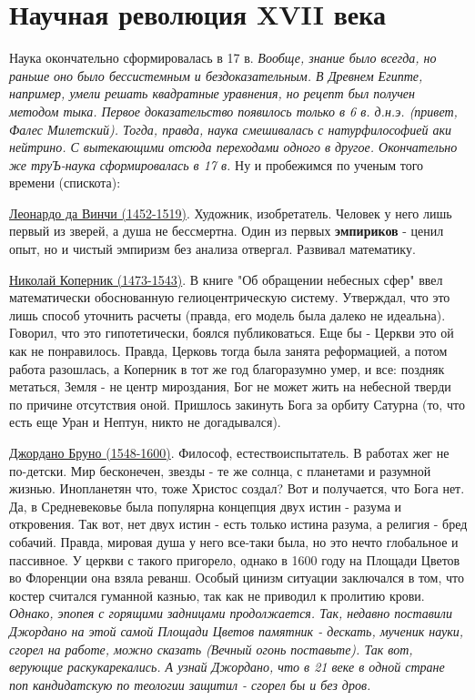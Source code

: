 \section{Научная революция XVII века}
Наука окончательно сформировалась в 17 в. \textit{Вообще, знание было всегда, но раньше оно было бессистемным и бездоказательным. В Древнем Египте, например, умели решать квадратные уравнения, но рецепт был получен методом тыка. Первое доказательство появилось только в 6 в. д.н.э. (привет, Фалес Милетский). Тогда, правда, наука смешивалась с натурфилософией аки нейтрино. С вытекающими отсюда переходами одного в другое. Окончательно же труЪ-наука сформировалась в 17 в.}
Ну и пробежимся по ученым того времени (спискота):

\underline{Леонардо да Винчи (1452-1519)}. Художник, изобретатель. Человек у него лишь первый из зверей, а душа не бессмертна. Один из первых \textbf{эмпириков} - ценил опыт, но и чистый эмпиризм без анализа отвергал. Развивал математику.

\underline{Николай Коперник (1473-1543)}. В книге "Об обращении небесных сфер" ввел математически обоснованную гелиоцентрическую систему. Утверждал, что это лишь способ уточнить расчеты (правда, его модель была далеко не идеальна). Говорил, что это гипотетически, боялся публиковаться. Еще бы - Церкви это ой как не понравилось. Правда, Церковь тогда была занята реформацией, а потом работа разошлась, а Коперник в тот же год благоразумно умер, и все: поздняк метаться, Земля - не центр мироздания, Бог не может жить на небесной тверди по причине отсутствия оной. Пришлось закинуть Бога за орбиту Сатурна (то, что есть еще Уран и Нептун, никто не догадывался).

\underline{Джордано Бруно (1548-1600)}. Философ, естествоиспытатель. В работах жег не по-детски. Мир бесконечен, звезды - те же солнца, с планетами и разумной жизнью. Инопланетян что, тоже Христос создал? Вот и получается, что Бога нет. Да, в Средневековье была популярна концепция двух истин - разума и откровения. Так вот, нет двух истин - есть только истина разума, а религия - бред собачий.  Правда, мировая душа у него все-таки была, но это нечто глобальное и пассивное. У церкви с такого пригорело, однако в 1600 году на Площади Цветов во Флоренции она взяла реванш. Особый цинизм ситуации заключался в том, что костер считался гуманной казнью, так как не приводил к пролитию крови. \textit{Однако, эпопея с горящими задницами продолжается. Так, недавно поставили Джордано на этой самой Площади Цветов памятник - дескать, мученик науки, сгорел на работе, можно сказать (\textit{Вечный огонь поставьте}). Так вот, верующие раскукарекались. А узнай Джордано, что в 21 веке в одной стране поп кандидатскую по теологии защитил - сгорел бы и без дров.}

